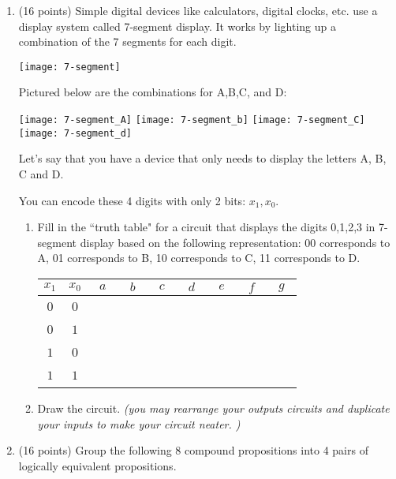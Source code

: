 \documentclass[10pt,letterpaper,unboxed,cm]{article}
\begin{document}
\begin{enumerate}
\item (16 points)
Simple digital devices like calculators, digital clocks, etc. use a display system called 7-segment display. It works by lighting up a combination of the 7 segments for each digit.

\texttt{[image: 7-segment]}

Pictured below are the combinations for A,B,C, and D:

\texttt{[image: 7-segment\_A]}
\texttt{[image: 7-segment\_b]}
\texttt{[image: 7-segment\_C]}
\texttt{[image: 7-segment\_d]}

Let's say that you have a device that only needs to display the letters A, B, C and D.

You can encode these 4 digits with only 2 bits: $x_1,x_0$.

\begin{enumerate}
\item
Fill in the ``truth table" for a circuit that displays the digits 0,1,2,3 in 7-segment display based on the following representation: 00 corresponds to A, 01 corresponds to B, 10 corresponds to C, 11 corresponds to D.

\begin{tabular}{|c|c||c|c|c|c|c|c|c|}
\hline
$x_1$&$x_0$&$~~a~~$&$~~b~~$&$~~c~~$&$~~d~~$&$~~e~~$&$~~f~~$&$~~g~~$\\
\hline
&&&&&&&&\\
$0$&$0$&&&&&&&\\
&&&&&&&&\\
\hline
&&&&&&&&\\
$0$&$1$&&&&&&&\\
&&&&&&&&\\
\hline
&&&&&&&&\\
$1$&$0$&&&&&&&\\
&&&&&&&&\\
\hline
&&&&&&&&\\
$1$&$1$&&&&&&&\\
&&&&&&&&\\
\hline
\end{tabular}

\item
Draw the circuit.
\emph{(you may rearrange your outputs circuits and duplicate your inputs to make your circuit neater. )}
\end{enumerate}

   
    

   
    
    \item (16 points) Group the following 8 compound propositions into 4 pairs of logically equivalent propositions.
    

\end{enumerate}
\end{document}
